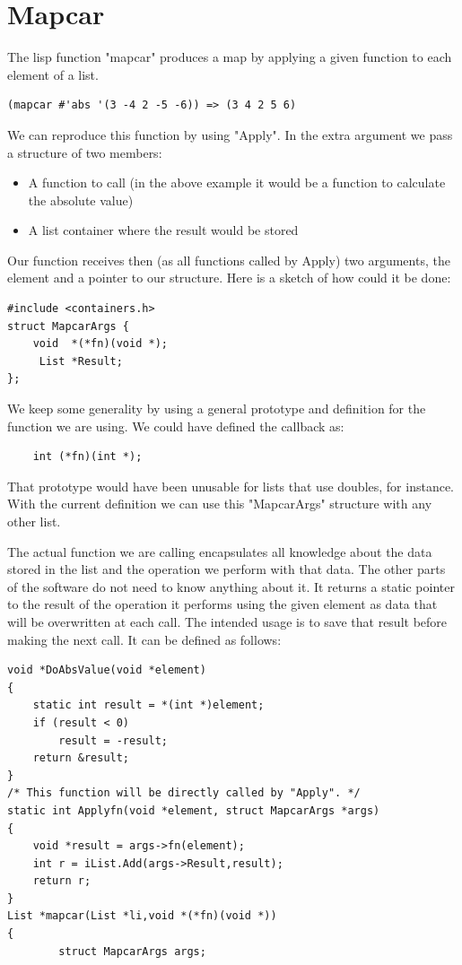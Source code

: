\documentclass[12pt,a4paper,openany]{memoir} %
\begin{document}
{{\section{Mapcar}
The lisp function "mapcar" produces a map by applying a given function to each element of a list.
\begin{verbatim}
(mapcar #'abs '(3 -4 2 -5 -6)) => (3 4 2 5 6) 
\end{verbatim}
We can reproduce this function by using "Apply". In the extra argument we pass a structure of two members: 
\begin{itemize}
\item A function to call (in the above example it would be a function to calculate the absolute value)
\item A list container where the result would be stored
\end{itemize}
Our function receives then (as all functions called by Apply) two arguments, the element and a pointer to our structure. Here is a sketch of how could it be done:
\begin{verbatim}
#include <containers.h>
struct MapcarArgs {
    void  *(*fn)(void *);
     List *Result;
};
\end{verbatim}
We keep some generality by using a general prototype and definition for the function we are using. We could have defined the callback as:
\begin{verbatim}
    int (*fn)(int *);
\end{verbatim}
That prototype would have been unusable for lists that use doubles, for instance. With the current definition we can use this "MapcarArgs" structure with any other list.

The actual function we are calling encapsulates all knowledge about the data stored in the list and the operation we perform with that data. The other parts of the software do not need to know anything about it.  It returns a static pointer to the result of the operation it performs using the given element as data that will be overwritten at each call. The intended usage is to save that result before making the next call.
It can be defined as follows:
\begin{verbatim}
void *DoAbsValue(void *element)
{
    static int result = *(int *)element;
    if (result < 0)
        result = -result;
    return &result;
}
/* This function will be directly called by "Apply". */
static int Applyfn(void *element, struct MapcarArgs *args)
{
    void *result = args->fn(element);
    int r = iList.Add(args->Result,result);
    return r;
}
List *mapcar(List *li,void *(*fn)(void *))
{
        struct MapcarArgs args;


\end{verbatim}}}
\end{document}
